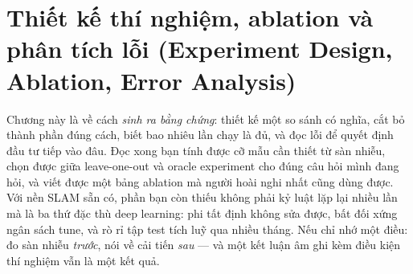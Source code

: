 \documentclass[../../deep_learning.tex]{subfiles}
\begin{document}
\chapter{Thiết kế thí nghiệm, ablation và phân tích lỗi (Experiment Design, Ablation, Error Analysis)}

\begin{tomtat}
Chương này là về cách \emph{sinh ra bằng chứng}: thiết kế một so sánh có nghĩa, cắt bỏ thành phần đúng cách, biết bao nhiêu lần chạy là đủ, và đọc lỗi để quyết định đầu tư tiếp vào đâu. Đọc xong bạn tính được cỡ mẫu cần thiết từ sàn nhiễu, chọn được giữa leave-one-out và oracle experiment cho đúng câu hỏi mình đang hỏi, và viết được một bảng ablation mà người hoài nghi nhất cũng dùng được. Với nền SLAM sẵn có, phần bạn còn thiếu không phải kỷ luật lặp lại nhiều lần mà là ba thứ đặc thù deep learning: phi tất định không sửa được, bất đối xứng ngân sách tune, và rò rỉ tập test tích luỹ qua nhiều tháng. Nếu chỉ nhớ một điều: đo sàn nhiễu \emph{trước}, nói về cải tiến \emph{sau} --- và một kết luận âm ghi kèm điều kiện thí nghiệm vẫn là một kết quả.
\end{tomtat}
\end{document}
